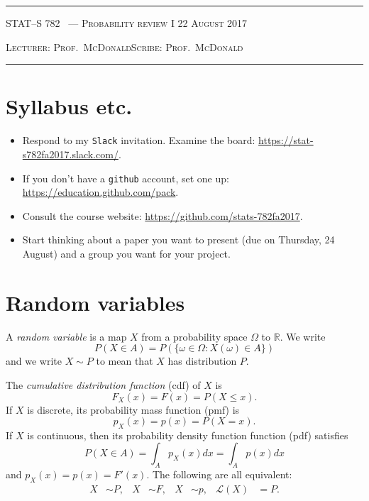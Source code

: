 \documentclass[10pt]{article}
\newcounter{lecnum}
\newcommand{\R}{\mathbb{R}}
\newcommand{\lecturer}{Prof.\ McDonald}
\newcommand{\scribe}{Prof.\ McDonald}
\newcommand{\chtitle}{Probability review I}
\newcommand{\lecdate}{22 August 2017}
\begin{document}
\rule{6.5in}{1pt}

\textsc{STAT--S 782
        \hfill \thelecnum\ --- \chtitle
        \hfill \lecdate}

\textsc{Lecturer: \lecturer \hfill Scribe: \scribe}
\rule{6.5in}{1pt}



\section*{Syllabus etc.}

\begin{itemize}
\item Respond to my {\tt Slack} invitation. Examine the board: \url{https://stat-s782fa2017.slack.com/}.
\item If you don't have a {\tt github} account, set one up:
  \url{https://education.github.com/pack}.
\item Consult the course website:
  \url{https://github.com/stats-782fa2017}.
\item Start thinking about a paper you want to present (due on
  Thursday, 24 August) and a group you want for your project.
\end{itemize}


\section{Random variables}
\label{sec:random-variables}

A {\em random variable} is a map $X$ from a probability space $\Omega$ to $\R$. We write
\begin{equation}
  P(X\in A)=P(\{\omega\in\Omega : X(\omega)\in A\})\label{eq:1}
\end{equation}
and we write $X \sim P$ to mean that $X$ has distribution $P$. 

The {\em cumulative distribution function} (cdf) of $X$ is
\begin{equation}
  F_X(x) = F(x) = P(X \leq x).\label{eq:2}
\end{equation}
If $X$ is discrete, its probability mass function (pmf) is
\begin{equation}
p_X(x) = p(x) = P(X = x).\label{eq:3}
\end{equation}
If $X$ is continuous, then its probability density function function (pdf) satisfies
\begin{equation}
P(X \in A) = \int_A p_X(x)dx = \int_A p(x)dx\label{eq:4}
\end{equation}
and $p_X(x) = p(x) = F'(x)$. The following are all equivalent:
\begin{align}
  X&\sim P,& X&\sim F, & X&\sim p, & \mathcal{L}(X)&=P.
\end{align}
\end{document}
